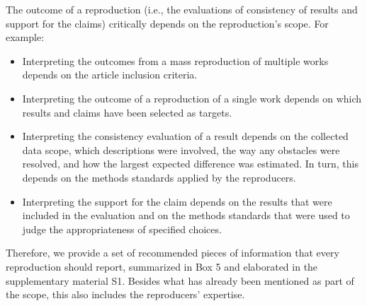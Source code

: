 \documentclass[authordate, meta]{jote-new-article}
\begin{document}
	The outcome of a reproduction (i.e., the evaluations of consistency of results and support for the claims) critically depends on the reproduction's scope. For example:
	\begin{itemize}


		\item Interpreting the outcomes from a mass reproduction of multiple works depends on the article inclusion criteria.



		\item
		Interpreting the outcome of a reproduction of a single work depends on which results and claims have been selected as targets.



		\item Interpreting the consistency evaluation of a result depends on the collected data scope, which descriptions were involved, the way any obstacles were resolved, and how the largest expected difference was estimated. In turn, this depends on the methods standards applied by the reproducers.



		\item
		Interpreting the support for the claim depends on the results that were included in the evaluation and on the methods standards that were used to judge the appropriateness of specified choices.


	\end{itemize}

	Therefore, we provide a set of recommended pieces of information that every reproduction should report, summarized in Box 5 and elaborated in the supplementary material S1. Besides what has already been mentioned as part of the scope, this also includes the reproducers' expertise.
\end{document}
